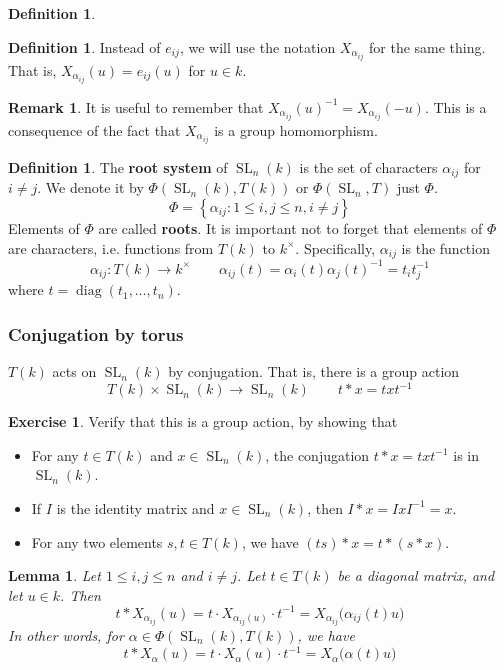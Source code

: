 \documentclass[12pt]{article}
\newtheorem{lemma}[theorem]{Lemma}
\theoremstyle{definition}
\newtheorem{definition}[theorem]{Definition}
\newtheorem{remark}[theorem]{Remark}
\newtheorem{exercise}[theorem]{Exercise}
\numberwithin{theorem}{subsection}
\newcommand{\lb}{\left\{}
\newcommand{\rb}{\right\}}
\newcommand{\tbf}{\textbf}
\newcommand{\inv}{^{-1}}
\DeclareMathOperator{\SL}{SL}
\DeclareMathOperator{\diag}{diag}
\begin{document}
\begin{definition}
\begin{definition}
Instead of $e_{ij}$, we will use the notation $X_{\alpha_{ij}}$ for the same thing. That is, $X_{\alpha_{ij}}(u) = e_{ij}(u)$ for $u \in k$.
\end{definition}

\begin{remark}
It is useful to remember that $X_{\alpha_{ij}}(u) \inv = X_{\alpha_{ij}}(-u)$. This is a consequence of the fact that $X_{\alpha_{ij}}$ is a group homomorphism.
\end{remark}

\begin{definition}
The \tbf{root system} of $\SL_n(k)$ is the set of characters $\alpha_{ij}$ for $i \neq j$. We denote it by $\Phi(\SL_n(k), T(k))$ or $\Phi(\SL_n, T)$ just $\Phi$.
\[
	\Phi = \lb \alpha_{ij} : 1 \le i, j \le n, i \neq j \rb
\]
Elements of $\Phi$ are called \tbf{roots}. It is important not to forget that elements of $\Phi$ are characters, i.e. functions from $T(k)$ to $k^\times$. Specifically, $\alpha_{ij}$ is the function
\[
	\alpha_{ij}:T(k) \to k^\times \qquad \alpha_{ij}(t) = \alpha_i(t) \alpha_j(t) \inv = t_i t_j \inv
\]
where $t = \diag(t_1, \ldots, t_n)$.
\end{definition}

\subsubsection{Conjugation by torus}

$T(k)$ acts on $\SL_n(k)$ by conjugation. That is, there is a group action 
\[
	T(k) \times \SL_n(k) \to \SL_n(k) \qquad t * x = txt \inv
\]
\end{definition}

\begin{exercise}
Verify that this is a group action, by showing that
\begin{itemize}
	\item For any $t \in T(k)$ and $x \in \SL_n(k)$, the conjugation $t*x = txt \inv$ is in $\SL_n(k)$.
	\item If $I$ is the identity matrix and $x \in \SL_n(k)$, then $I * x = Ix I \inv = x$.
	\item For any two elements $s, t \in T(k)$, we have $(ts) * x  = t * (s * x)$. 
\end{itemize}
\end{exercise}


\begin{lemma}
Let $1 \le i,j \le n$ and $i \neq j$. Let $t \in T(k)$ be a diagonal matrix, and let $u \in k$. Then
\[
	t * X_{\alpha_{ij}}(u) = t \cdot X_{\alpha_{ij}(u)} \cdot t \inv = X_{\alpha_{ij}} \Big( \alpha_{ij}(t) u \Big)
\]
In other words, for $\alpha \in \Phi(\SL_n(k), T(k))$, we have
\[
	t * X_\alpha(u) = t \cdot X_\alpha(u) \cdot t \inv = X_\alpha \Big( \alpha(t) u \Big)
\]
\end{lemma}
\end{document}
